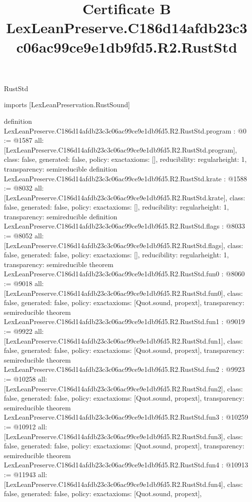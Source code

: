 \begin{lexlean}{RustStd}
\title{Certificate B LexLeanPreserve.C186d14afdb23c3c06ac99ce9e1db9fd5.R2.RustStd}
\begin{coremodule}
imports [LexLeanPreservation.RustSound]

definition LexLeanPreserve.C186d14afdb23c3c06ac99ce9e1db9fd5.R2.RustStd.program : @0 := @1587 {
  all: [LexLeanPreserve.C186d14afdb23c3c06ac99ce9e1db9fd5.R2.RustStd.program],
  class: false,
  generated: false,
  policy: exact{axioms: []},
  reducibility: regular{height: 1},
  transparency: semireducible
}
definition LexLeanPreserve.C186d14afdb23c3c06ac99ce9e1db9fd5.R2.RustStd.krate : @1588 := @8032 {
  all: [LexLeanPreserve.C186d14afdb23c3c06ac99ce9e1db9fd5.R2.RustStd.krate],
  class: false,
  generated: false,
  policy: exact{axioms: []},
  reducibility: regular{height: 1},
  transparency: semireducible
}
definition LexLeanPreserve.C186d14afdb23c3c06ac99ce9e1db9fd5.R2.RustStd.flags : @8033 := @8052 {
  all: [LexLeanPreserve.C186d14afdb23c3c06ac99ce9e1db9fd5.R2.RustStd.flags],
  class: false,
  generated: false,
  policy: exact{axioms: []},
  reducibility: regular{height: 1},
  transparency: semireducible
}
theorem LexLeanPreserve.C186d14afdb23c3c06ac99ce9e1db9fd5.R2.RustStd.fun0 : @8060 := @9018 {
  all: [LexLeanPreserve.C186d14afdb23c3c06ac99ce9e1db9fd5.R2.RustStd.fun0],
  class: false,
  generated: false,
  policy: exact{axioms: [Quot.sound, propext]},
  transparency: semireducible
}
theorem LexLeanPreserve.C186d14afdb23c3c06ac99ce9e1db9fd5.R2.RustStd.fun1 : @9019 := @9922 {
  all: [LexLeanPreserve.C186d14afdb23c3c06ac99ce9e1db9fd5.R2.RustStd.fun1],
  class: false,
  generated: false,
  policy: exact{axioms: [Quot.sound, propext]},
  transparency: semireducible
}
theorem LexLeanPreserve.C186d14afdb23c3c06ac99ce9e1db9fd5.R2.RustStd.fun2 : @9923 := @10258 {
  all: [LexLeanPreserve.C186d14afdb23c3c06ac99ce9e1db9fd5.R2.RustStd.fun2],
  class: false,
  generated: false,
  policy: exact{axioms: [Quot.sound, propext]},
  transparency: semireducible
}
theorem LexLeanPreserve.C186d14afdb23c3c06ac99ce9e1db9fd5.R2.RustStd.fun3 : @10259 := @10912 {
  all: [LexLeanPreserve.C186d14afdb23c3c06ac99ce9e1db9fd5.R2.RustStd.fun3],
  class: false,
  generated: false,
  policy: exact{axioms: [Quot.sound, propext]},
  transparency: semireducible
}
theorem LexLeanPreserve.C186d14afdb23c3c06ac99ce9e1db9fd5.R2.RustStd.fun4 : @10913 := @11943 {
  all: [LexLeanPreserve.C186d14afdb23c3c06ac99ce9e1db9fd5.R2.RustStd.fun4],
  class: false,
  generated: false,
  policy: exact{axioms: [Quot.sound, propext]},
}
\end{coremodule}
\end{lexlean}
